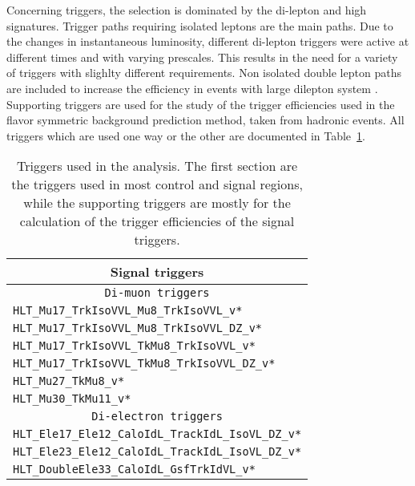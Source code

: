 Concerning triggers, the selection is dominated by the di-lepton and high \ptmiss signatures. Trigger paths requiring isolated leptons are the main paths. Due to the changes in instantaneous 
luminosity, different di-lepton triggers were active at different times and with varying prescales. This results in the need for a variety of triggers with slighlty different requirements.
Non isolated double lepton paths are included to increase the efficiency in events with large dilepton system \pt. Supporting triggers are used for the study of the 
trigger efficiencies used in the flavor symmetric background prediction method, taken from hadronic events. 
All triggers which are used one way or the other are documented in Table~\ref{tab:triggers}.
\begin{table}[ht!]
\def\arraystretch{1.2}
    \caption{Triggers used in the analysis. The first section are the triggers
    used in most control and signal regions, while the supporting triggers are mostly for the calculation
    of the trigger efficiencies of the signal triggers.}
    \label{tab:triggers}
    \begin{center}
        \begin{tabular}{ l}
        \hline \hline
        \multicolumn{1}{c}{\textbf{Signal triggers} }             \\
        \hline 
        \multicolumn{1}{c}{\texttt{Di-muon triggers} }             \\
        \hline 
        \texttt{HLT\_Mu17\_TrkIsoVVL\_Mu8\_TrkIsoVVL\_v*}         \\
        \texttt{HLT\_Mu17\_TrkIsoVVL\_Mu8\_TrkIsoVVL\_DZ\_v*}      \\
        \texttt{HLT\_Mu17\_TrkIsoVVL\_TkMu8\_TrkIsoVVL\_v*}       \\
        \texttt{HLT\_Mu17\_TrkIsoVVL\_TkMu8\_TrkIsoVVL\_DZ\_v*}     \\
        \texttt{HLT\_Mu27\_TkMu8\_v*}                                \\ 
        \texttt{HLT\_Mu30\_TkMu11\_v*}                               \\
        \hline 
        \multicolumn{1}{c}{\texttt{Di-electron triggers} }             \\
        \hline 
        \texttt{HLT\_Ele17\_Ele12\_CaloIdL\_TrackIdL\_IsoVL\_DZ\_v*}   \\ 
        \texttt{HLT\_Ele23\_Ele12\_CaloIdL\_TrackIdL\_IsoVL\_DZ\_v*}    \\
        \texttt{HLT\_DoubleEle33\_CaloIdL\_GsfTrkIdVL\_v*}               \\

\end{tabular}
\end{center}
\end{table}

